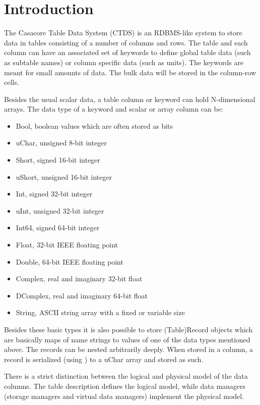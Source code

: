 
\section{Introduction}
The Casacore Table Data System (CTDS) is an RDBMS-like system to store data in
tables consisting of a number of columns and rows. The
table and each column can have an associated set of keywords
to define global table data (such as subtable names) or column specific data (such as units).
The keywords are meant for small amounts of data. The bulk data will
be stored in the column-row cells.

Besides the usual scalar data, a table column or keyword can hold
N-dimensional arrays.
The data type of a keyword and scalar or array column can be:
\begin{itemize}
\item Bool, boolean values which are often stored as bits
\item uChar, unsigned 8-bit integer
\item Short, signed 16-bit integer
\item uShort, unsigned 16-bit integer
\item Int, signed 32-bit integer
\item uInt, unsigned 32-bit integer
\item Int64, signed 64-bit integer
\item Float, 32-bit IEEE floating point
\item Double, 64-bit IEEE floating point
\item Complex, real and imaginary 32-bit float
\item DComplex, real and imaginary 64-bit float
\item String, ASCII string array with a fixed or variable size
\end{itemize}

Besides these basic types it is also possible to store (Table)Record
objects which are basically maps of name strings to values of one of the data
types mentioned above. The records can be nested arbitrarily deeply.
When stored in a column, a record is serialized (using
) to a uChar array and stored as such.

There is a strict distinction between the logical and physical
model of the data columns.
The table description defines the logical model, while data managers
(storage managers and virtual data managers) implement the physical
model.

